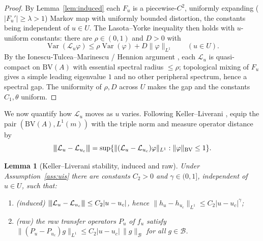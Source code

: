 \documentclass[11pt,a4paper]{article}
\newcommand{\vertiii}[1]{{\left\vert\kern-0.25ex\left\vert\kern-0.25ex\left\vert #1 \right\vert\kern-0.25ex\right\vert\kern-0.25ex\right\vert}}
\newtheorem{lemma}[theorem]{Lemma}
\theoremstyle{definition}
\begin{document}
\begin{proof}
By Lemma~\ref{lem:induced} each $F_u$ is a piecewise-$C^2$, uniformly
expanding ($|F_u'| \geq \lambda > 1$) Markov map with uniformly bounded
distortion, the constants being independent of $u \in U$. The
Lasota--Yorke inequality \cite{lasota1973existence} then holds with
$u$-uniform constants: there are $\rho \in (0,1)$ and $D > 0$ with
\[
  \operatorname{Var}(\mathcal{L}_u \varphi)
  \leq \rho \operatorname{Var}(\varphi) + D \|\varphi\|_{L^1}
  \qquad (u \in U).
\]
By the Ionescu-Tulcea--Marinescu / Hennion argument
\cite[Ch.\ III]{baladi2000positive}, each $\mathcal{L}_u$ is
quasi-compact on $\mathrm{BV}(A)$ with essential spectral radius
$\leq \rho$; topological mixing of $F_u$ gives a simple leading
eigenvalue $1$ and no other peripheral spectrum, hence a spectral gap.
The uniformity of $\rho, D$ across $U$ makes the gap and the constants
$C_1, \theta$ uniform.
\end{proof}

We now quantify how $\mathcal{L}_u$ moves as $u$ varies. Following
Keller--Liverani \cite{kellerliverani1999}, equip the pair
$(\mathrm{BV}(A), L^1(m))$ with the triple norm and measure operator
distance by
\[
  \vertiii{\mathcal{L}_u - \mathcal{L}_{u_c}}
  = \sup\{ \|(\mathcal{L}_u - \mathcal{L}_{u_c})\varphi\|_{L^1}
           : \|\varphi\|_{\mathrm{BV}} \leq 1 \}.
\]

\begin{lemma}[Keller--Liverani stability, induced and raw]
\label{lem:kl}
Under Assumption~\ref{ass:uis} there are constants $C_2 > 0$ and
$\gamma \in (0,1]$, independent of $u\in U$, such that:
\begin{enumerate}
\item[\textup{(a)}] (induced) $\vertiii{\mathcal{L}_u - \mathcal{L}_{u_c}}
\leq C_2 |u - u_c|$, hence $\|h_u - h_{u_c}\|_{L^1} \leq C_2 |u - u_c|^{\gamma}$;
\item[\textup{(b)}] (raw) the raw transfer operators $P_u$ of $f_u$
satisfy $\|(P_u - P_{u_c})g\|_{L^1} \leq C_2 |u - u_c|\,\|g\|_{\mathcal{B}}$
for all $g\in\mathcal{B}$.
\end{enumerate}
\end{lemma}
\end{document}
